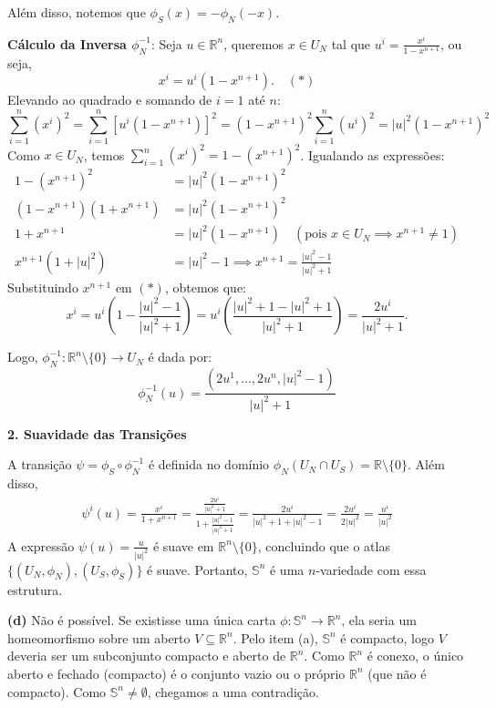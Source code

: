 {	Além disso, notemos que $\phi_S(x)=-\phi_N(-x)$. 
	
	\textbf{Cálculo da Inversa $\phi_N^{-1}$}: Seja $u \in \mathbb{R}^n$, queremos $x \in U_N$ tal que $u^i = \frac{x^i}{1-x^{n+1}}$, ou seja, 
	$$\boxed{x^i = u^i(1-x^{n+1}).}\quad (\ast)$$ 
	Elevando ao quadrado e somando de $i=1$ até $n$:
	$$\sum_{i=1}^n (x^i)^2 = \sum_{i=1}^n [u^i(1-x^{n+1})]^2 = (1-x^{n+1})^2 \sum_{i=1}^n (u^i)^2 = |u|^2 (1-x^{n+1})^2$$
	Como $x \in U_N$, temos $\sum_{i=1}^n (x^i)^2 = 1 - (x^{n+1})^2$. Igualando as expressões:
	\begin{align*}
		1 - (x^{n+1})^2 &= |u|^2 (1-x^{n+1})^2 \\
		(1-x^{n+1})(1+x^{n+1}) &= |u|^2 (1-x^{n+1})^2 \\
		1+x^{n+1} &= |u|^2 (1-x^{n+1}) \quad (\text{pois } x \in U_N \implies x^{n+1} \neq 1) \\
		x^{n+1}(1+|u|^2) &= |u|^2 - 1 \implies x^{n+1} = \frac{|u|^2-1}{|u|^2+1}
	\end{align*}
	Substituindo $x^{n+1}$  em $(\ast)$, obtemos que: $$x^i = u^i \left(1 - \frac{|u|^2-1}{|u|^2+1}\right) = u^i \left(\frac{|u|^2+1 - |u|^2 + 1}{|u|^2+1}\right) = \frac{2u^i}{|u|^2+1}.$$
	
	Logo, $\phi_N^{-1}:\mathbb{R}^n\setminus\{0\}\rightarrow U_N$ é dada por:
	$$\phi_N^{-1}(u)=\frac{\left(2u^1,\dots,2u^n,|u|^2-1\right)}{|u|^2+1}$$
	
	\textbf{2. Suavidade das Transições}
	
	A transição $\psi = \phi_S \circ \phi_N^{-1}$ é definida no domínio $\phi_N(U_N \cap U_S) = \mathbb{R}\setminus\{0\}$. Além disso,
	\begin{align*}
		\psi^i(u) = \frac{x^i}{1+x^{n+1}} = \frac{\frac{2u^i}{|u|^2+1}}{1 + \frac{|u|^2-1}{|u|^2+1}} = \frac{2u^i}{|u|^2+1+|u|^2-1} = \frac{2u^i}{2|u|^2} = \frac{u^i}{|u|^2}
	\end{align*}
	A expressão $\psi(u) = \frac{u}{|u|^2}$ é suave em $\mathbb{R}^n \setminus \{0\}$, concluindo que o atlas $\{(U_N,\phi_N),(U_S,\phi_S)\}$ é suave. Portanto, $\mathbb{S}^n$ é uma $n$-variedade com essa estrutura.
	
	\textbf{(d)} Não é possível. Se existisse uma única carta $\phi: \mathbb{S}^n \to \mathbb{R}^n$, ela seria um homeomorfismo sobre um aberto $V \subseteq \mathbb{R}^n$. Pelo item (a), $\mathbb{S}^n$ é compacto, logo $V$ deveria ser um subconjunto compacto e aberto de $\mathbb{R}^n$. Como $\mathbb{R}^n$ é conexo, o único aberto e fechado (compacto) é o conjunto vazio ou o próprio $\mathbb{R}^n$ (que não é compacto). Como $\mathbb{S}^n \neq \emptyset$, chegamos a uma contradição.
}
